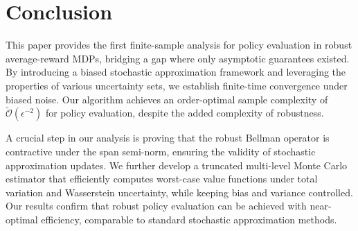 \section{Conclusion}
This paper provides the first finite-sample analysis for policy evaluation in robust average-reward MDPs, 
bridging a gap where only asymptotic guarantees existed. By introducing a biased stochastic approximation framework and leveraging the properties of various uncertainty sets, we establish finite-time convergence under biased noise. Our algorithm achieves an order-optimal sample complexity of  $\tilde{\mathcal{O}}(\epsilon^{-2})$ for policy evaluation, despite the added complexity of robustness.

A crucial step in our analysis is proving that the robust Bellman operator is contractive under the span 
semi-norm, ensuring the validity of stochastic approximation updates. We further develop a truncated 
multi-level Monte Carlo estimator that efficiently computes worst-case value functions under total variation and Wasserstein uncertainty, while keeping bias and variance controlled. Our results confirm that robust policy evaluation can be achieved with near-optimal efficiency, comparable to standard stochastic approximation methods.